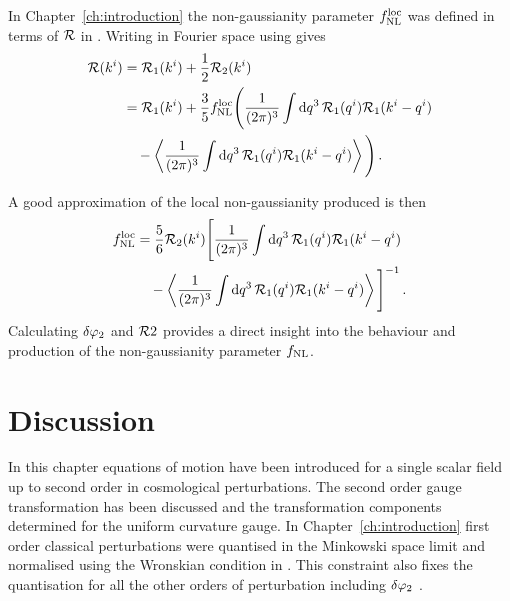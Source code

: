 In Chapter~\ref{ch:introduction} the non-gaussianity parameter $f_{\mathrm{NL}}^\mathrm{loc}$ was defined
in terms of $\mathcal{R}$ in . Writing  in
Fourier space using  gives
% 
\begin{align}
 \R(\kvi) &= \R_1(\kvi) + \frac{1}{2}\R_2(\kvi) \nonumber \\
% 
 &= \R_1(\kvi)
  + \frac{3}{5}\fnlloc \Bigg( \frac{1}{(2\pi)^3}\int \d q^3\, \R_1(\qvi)
\R_1(\kvi-\qvi) \\ \nonumber
% 
  &\quad- \left\langle \frac{1}{(2\pi)^3} \int \d q^3\, \R_1(\qvi)
\R_1(\kvi-\qvi) \right\rangle \Bigg) \,.
\end{align}

A good approximation of the local non-gaussianity produced is then 
% 
\begin{align}
 \label{eq:fnlloc-perts}
\fnlloc &= \frac{5}{6} \R_2(\kvi) \Bigg[ \frac{1}{(2\pi)^3}\int \d q^3\, \R_1(\qvi)
\R_1(\kvi-\qvi) \\ \nonumber
% 
  &\quad- \left\langle \frac{1}{(2\pi)^3} \int \d q^3\, \R_1(\qvi)
\R_1(\kvi-\qvi) \right\rangle \Bigg]^{-1} \,.
\end{align}
% 
Calculating $\delta\varphi_{2}$ and $\mathcal{R}2$ provides a direct insight into the behaviour and
production of the non-gaussianity parameter $f_{\mathrm{NL}}$. 

% 
% 
% 
% 
\section{Discussion}
\label{sec:disc-perts}

In this chapter equations of motion have been introduced for a single scalar field
up to second order in cosmological perturbations. The second order gauge
transformation has been discussed and the transformation components determined for
the uniform curvature gauge.
% 
In Chapter~\ref{ch:introduction} first order classical perturbations were quantised
in the Minkowski space limit and normalised using the Wronskian condition in
. This constraint also fixes the quantisation for all
the other orders of perturbation including $\delta\varphi_{2}$ \cite{Seery:2008qj}. 

